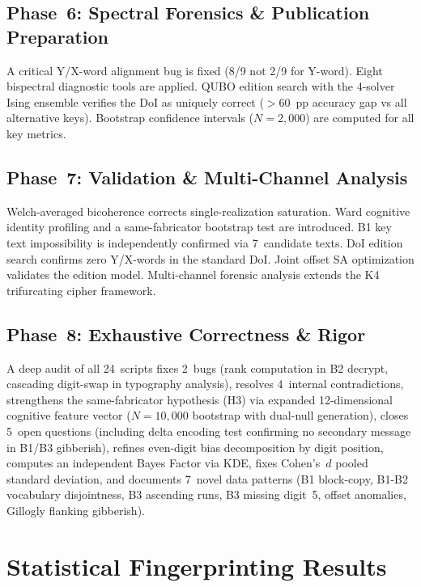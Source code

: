 \documentclass[11pt,a4paper]{article}
\begin{document}
\subsection{Phase~6: Spectral Forensics \& Publication Preparation}

A critical Y/X-word alignment bug is fixed (8/9 not 2/9 for Y-word).
Eight bispectral diagnostic tools are applied. QUBO edition search
with the 4-solver Ising ensemble verifies the DoI as uniquely correct
($>$60~pp accuracy gap vs all alternative keys). Bootstrap confidence
intervals ($N{=}2{,}000$) are computed for all key metrics.

\subsection{Phase~7: Validation \& Multi-Channel Analysis}

Welch-averaged bicoherence corrects single-realization saturation.
Ward cognitive identity profiling and a same-fabricator bootstrap test
are introduced. B1 key text impossibility is independently confirmed
via 7~candidate texts. DoI edition search confirms zero Y/X-words in
the standard DoI. Joint offset SA optimization validates the edition
model. Multi-channel forensic analysis extends the K4 trifurcating
cipher framework.

\subsection{Phase~8: Exhaustive Correctness \& Rigor}

A deep audit of all 24~scripts fixes 2~bugs (rank computation in B2
decrypt, cascading digit-swap in typography analysis), resolves 4~internal
contradictions, strengthens the same-fabricator hypothesis (H3) via
expanded 12-dimensional cognitive feature vector ($N{=}10{,}000$ bootstrap
with dual-null generation), closes 5~open questions (including delta
encoding test confirming no secondary message in B1/B3 gibberish),
refines even-digit bias decomposition by digit position, computes an
independent Bayes Factor via KDE, fixes Cohen's~$d$ pooled standard
deviation, and documents 7~novel data patterns (B1 block-copy, B1-B2
vocabulary disjointness, B3 ascending runs, B3 missing digit~5, offset
anomalies, Gillogly flanking gibberish).

\section{Statistical Fingerprinting Results}
\end{document}
